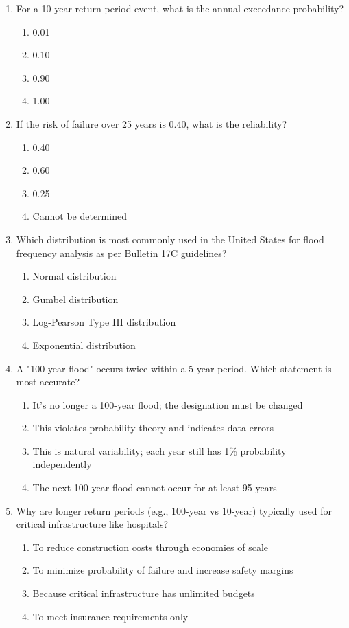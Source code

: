 \documentclass[11pt,a4paper]{article}
\begin{document}
\begin{enumerate}
\item For a 10-year return period event, what is the annual exceedance probability?
\begin{enumerate}[label=\Alph*)]
    \item 0.01
    \item 0.10
    \item 0.90
    \item 1.00
\end{enumerate}

\item If the risk of failure over 25 years is 0.40, what is the reliability?
\begin{enumerate}[label=\Alph*)]
    \item 0.40
    \item 0.60
    \item 0.25
    \item Cannot be determined
\end{enumerate}

\item Which distribution is most commonly used in the United States for flood frequency analysis as per Bulletin 17C guidelines?
\begin{enumerate}[label=\Alph*)]
    \item Normal distribution
    \item Gumbel distribution
    \item Log-Pearson Type III distribution
    \item Exponential distribution
\end{enumerate}

\item A "100-year flood" occurs twice within a 5-year period. Which statement is most accurate?
\begin{enumerate}[label=\Alph*)]
    \item It's no longer a 100-year flood; the designation must be changed
    \item This violates probability theory and indicates data errors
    \item This is natural variability; each year still has 1\% probability independently
    \item The next 100-year flood cannot occur for at least 95 years
\end{enumerate}

\item Why are longer return periods (e.g., 100-year vs 10-year) typically used for critical infrastructure like hospitals?
\begin{enumerate}[label=\Alph*)]
    \item To reduce construction costs through economies of scale
    \item To minimize probability of failure and increase safety margins
    \item Because critical infrastructure has unlimited budgets
    \item To meet insurance requirements only
\end{enumerate}


\end{enumerate}
\end{document}

